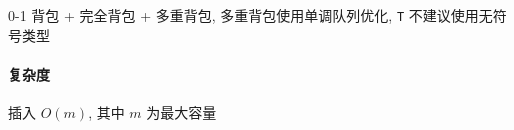 0-1 背包 + 完全背包 + 多重背包, 多重背包使用单调队列优化, \verb|T| 不建议使用无符号类型

\paragraph{复杂度} 插入 \(O(m)\), 其中 \(m\) 为最大容量